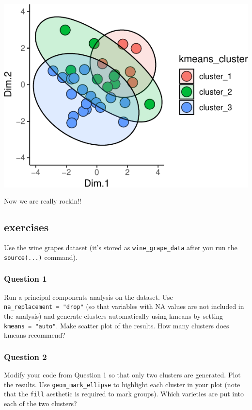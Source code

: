 \documentclass[
]{krantz}
\begin{document}
\begin{center}\includegraphics{index_files/figure-latex/unnamed-chunk-108-1} \end{center}

Now we are really rockin!!

\hypertarget{exercises-5}{%
\subsection{exercises}\label{exercises-5}}

Use the wine grapes dataset (it's stored as \texttt{wine\_grape\_data} after you run the \texttt{source(...)} command).

\hypertarget{question-1}{%
\subsubsection{Question 1}\label{question-1}}

Run a principal components analysis on the dataset. Use \texttt{na\_replacement\ =\ "drop"} (so that variables with NA values are not included in the analysis) and generate clusters automatically using kmeans by setting \texttt{kmeans\ =\ "auto"}. Make scatter plot of the results. How many clusters does kmeans recommend?

\hypertarget{question-2}{%
\subsubsection{Question 2}\label{question-2}}

Modify your code from Question 1 so that only two clusters are generated. Plot the results. Use \texttt{geom\_mark\_ellipse} to highlight each cluster in your plot (note that the \texttt{fill} aesthetic is required to mark groups). Which varieties are put into each of the two clusters?
\end{document}
